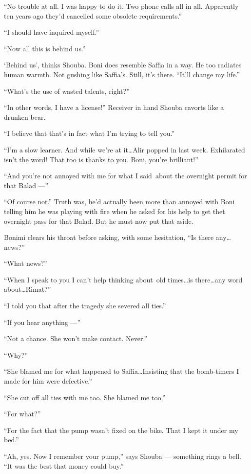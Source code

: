 \documentclass[twoside,11pt,openany]{book}
\begin{document}
``No trouble at all. I was happy to do it. Two phone calls all in all. Apparently ten years ago
they'd cancelled some obsolete requirements.''

``I should have inquired myself.''

``Now all this is behind us.''

`Behind us', thinks Shouba. Boni does resemble Saffia in a way. He too radiates human warmth. Not gushing like
Saffia's. Still, it's there. ``It'll change my life.''

``What's the use of wasted talents, right?''

``In other words, I have a license!'' Receiver in hand Shouba cavorts like a drunken bear.

``I believe that that's in fact what I'm trying to tell you.''

``I'm a slow learner. And while we're at it{\ldots}Alir popped in last week. Exhilarated isn't the word!
That too is thanks to you. Boni, you're brilliant!''

``And you're not annoyed with me for what I said~about the overnight permit for that Balad ---''

``Of course not.'' Truth{ }was, he'd actually been more than annoyed with Boni
telling him he was playing with fire when he asked for his help to get thet overnight pass for
that{ }Balad. But he must now put that aside.

Bonimi clears his throat before asking, with some hesitation, ``Is there any{\ldots}news?''

``What news?''

``When I speak to you I can't help thinking about~old times{\ldots}is there{\ldots}any word about{\ldots}Rimat?''

``I told you that after the tragedy she severed all ties.''

``If you hear anything ---''

``Not a chance. She won't make contact. Never.''

``Why?''

``She blamed me for what happened to Saffia{\ldots}Insisting that the bomb-timers I made for him were
defective.''

``She cut off all ties with me too. She blamed me too.''

``For what?''

``For the fact that the pump wasn't fixed on the bike. That I kept it under my bed.''

``Ah, yes. Now I remember your pump,'' says Shouba --- something rings a bell. ``It was the best that money
could buy.''
\end{document}
